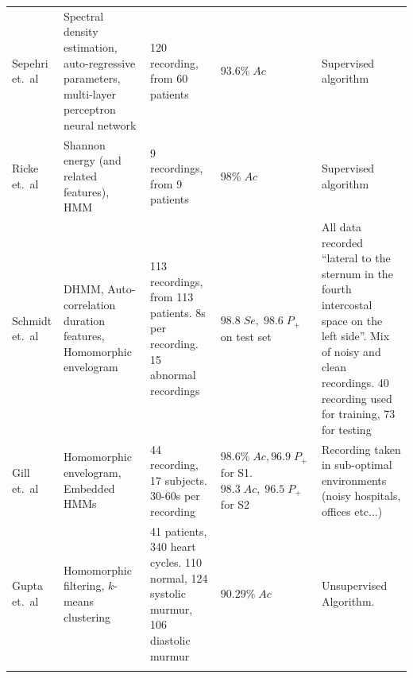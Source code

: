 \documentclass[titlepage, 12pt]{scrartcl} \usepackage{enumitem}
\newcommand{\dbottomrule}{\specialrule{1pt}{0pt}{1.4pt}%
            \specialrule{1pt}{0pt}{\belowrulesep}%
            }
\begin{document}
\begin{table}[htbp]
\begin{tabulary}{\linewidth}{LLLLL}
Sepehri et.\ al \citeyearpar{Sepehri2010}        & Spectral density estimation, auto-regressive parameters, multi-layer perceptron neural network & 120 recording, from 60 patients                                                       & $93.6\%\;Ac$                                           & Supervised algorithm                                                                                                                                                             \\
Ricke et.\ al \citeyearpar{Ricke2005}    & Shannon energy (and related features), HMM                                                     & 9 recordings, from 9 patients                                                         & $98\%\;Ac$                                             & Supervised algorithm                                                                                                                                                             \\
Schmidt et.\ al \citeyearpar{Schmidt2015}  & DHMM, Auto-correlation duration features, Homomorphic envelogram                               & 113 recordings, from 113 patients. 8s per recording. 15 abnormal recordings           & $98.8\;Se,\;98.6\;P_+$ on test set                         & All data recorded ``lateral to the sternum in the fourth intercostal space on the left side''. Mix of noisy and clean recordings. 40 recording used for training, 73 for testing \\
Gill et.\ al \citeyearpar{Gill2005}         & Homomorphic envelogram, Embedded HMMs                                                          & 44 recording, 17 subjects. 30-60s per recording                                       & $98.6\%\;Ac, 96.9\;P_+$ for S1. $98.3\;Ac,\;96.5\;P_+$ for S2 & Recording taken in sub-optimal environments (noisy hospitals, offices etc...)                                                                                                    \\
Gupta et.\ al \citeyearpar{Gupta2007}    & Homomorphic filtering, $k$-means clustering                                                       & 41 patients, 340 heart cycles. 110 normal,  124 systolic murmur, 106 diastolic murmur & $90.29\%\;Ac$                                          & Unsupervised Algorithm.                                                                                                                                                          \\ \hline
\dbottomrule\\
\end{tabulary}
\end{table}
\restoregeometry
\end{document}
